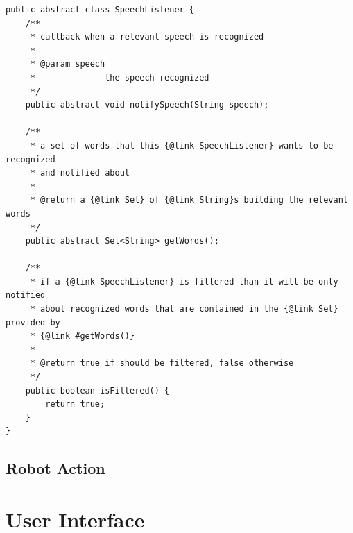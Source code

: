 \lstset{language=Java,
 basicstyle=\footnotesize, 
 numbers=left,
 captionpos=b,
 showspaces=false,             
 showstringspaces=false,}
\begin{lstlisting}[caption={Klasse SpeechListener}, label={listing:SpeechListener}]
public abstract class SpeechListener {
	/**
	 * callback when a relevant speech is recognized
	 * 
	 * @param speech
	 *            - the speech recognized
	 */
	public abstract void notifySpeech(String speech);

	/**
	 * a set of words that this {@link SpeechListener} wants to be recognized
	 * and notified about
	 * 
	 * @return a {@link Set} of {@link String}s building the relevant words
	 */
	public abstract Set<String> getWords();

	/**
	 * if a {@link SpeechListener} is filtered than it will be only notified
	 * about recognized words that are contained in the {@link Set} provided by
	 * {@link #getWords()}
	 * 
	 * @return true if should be filtered, false otherwise
	 */
	public boolean isFiltered() {
		return true;
	}
}
\end{lstlisting}

\subsection{Robot Action}

\section{User Interface}

